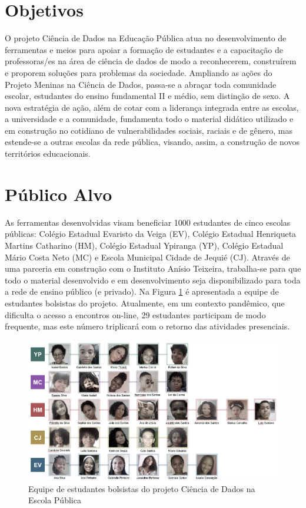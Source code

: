 \documentclass[
]{book}
\begin{document}
\hypertarget{objetivos}{%
\section*{Objetivos}\label{objetivos}}

O projeto Ciência de Dados na Educação Pública atua no desenvolvimento de ferramentas e meios para apoiar a formação de estudantes e a capacitação de professoras/es na área de ciência de dados de modo a reconhecerem, construírem e proporem soluções para problemas da sociedade.
Ampliando as ações do Projeto Meninas na Ciência de Dados, passa-se a abraçar toda comunidade escolar, estudantes do ensino fundamental II e médio, sem distinção de sexo.
A nova estratégia de ação, além de cotar com a liderança integrada entre as escolas, a universidade e a comunidade, fundamenta todo o material didático utilizado e em construção no cotidiano de vulnerabilidades sociais, raciais e de gênero, mas estende-se a outras escolas da rede pública, visando, assim, a construção de novos territórios educacionais.

\hypertarget{puxfablico-alvo}{%
\section*{Público Alvo}\label{puxfablico-alvo}}

As ferramentas desenvolvidas visam beneficiar 1000 estudantes de cinco escolas públicas: Colégio Estadual Evaristo da Veiga (EV), Colégio Estadual Henriqueta Martins Catharino (HM), Colégio Estadual Ypiranga (YP), Colégio Estadual Mário Costa Neto (MC) e Escola Municipal Cidade de Jequié (CJ).
Através de uma parceria em construção com o Instituto Anísio Teixeira, trabalha-se para que todo o material desenvolvido e em desenvolvimento seja disponibilizado para toda a rede de ensino público (e privado).
Na Figura \ref{fig:estudcdnaep} é apresentada a equipe de estudantes bolsistas do projeto. Atualmente, em um contexto pandêmico, que dificulta o acesso a encontros on-line, 29 estudantes participam de modo frequente, mas este número triplicará com o retorno das atividades presenciais.

\begin{figure}
\includegraphics[width=13.93in]{images/image111} \caption{Equipe de estudantes bolsistas do projeto Ciência de Dados na Escola Pública}\label{fig:estudcdnaep}
\end{figure}
\end{document}
